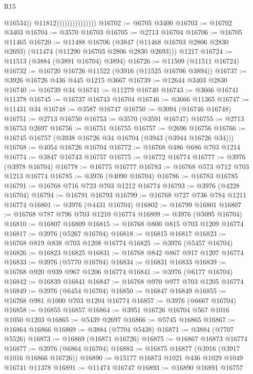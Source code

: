 \begin{lexlean}{R15}
\begin{coremodule}
                                      @16534))
                                  @11812)))))))))))))))
@16702 := @6705 @3400
@16703 := @16702 @3403
@16704 := @3570 @16703
@16705 := @2713 @16704
@16706 := @16705 @11465
@16720 := @11488
    @16706
    (@3847 (@11468 @16703 @2806 @2830 @2693) (@11474 (@11290 @16703 @2806 @2830 @2693)))
    @1217
@16724 := @11513 (@3884 (@3891 @16704) @3894)
@16726 := @11509 (@11511 @16724)
@16732 := @16720 @16726 @11522 (@3916 (@11525 @16706 @3894))
@16737 := @3926 @16726 @436 @445 @1215 @3667
@16739 := @12644 @3403 @2830
@16740 := @16739 @34
@16741 := @11279 @16740
@16743 := @3666 @16741 @11378
@16745 := @16737 @16743 @16704
@16746 := @3666 @11365
@16747 := @11431 @34
@16748 := @3587 @16747
@16750 := @3094 (@16746 @16748)
@16751 := @2713 @16750
@16753 := @3570 (@3591 @16747)
@16755 := @2713 @16753 @2697
@16756 := @16751 @16755
@16757 := @2696 @16756
@16766 := @16745 @16757 (@3938 @16726 @34 @16704 (@3943 (@3944 @16726 @34)))
@16768 := @4054 @16726 @16704
@16772 := @16768 @486 @686 @703 @1214
@16774 := @3847 @16743 @16757
@16775 := @16772 @16774
@16777 := @3976 (@3978 @16704)
@16778 := @16775 @16777
@16783 := @16768 @573 @712 @703 @1213 @16774
@16785 := @3976 (@4090 @16704)
@16786 := @16783 @16785
@16791 := @16768 @716 @723 @703 @1212 @16774
@16793 := @3976 (@4228 @16704)
@16794 := @16791 @16793
@16799 := @16768 @727 @736 @784 @1211 @16774
@16801 := @3976 (@4431 @16704)
@16802 := @16799 @16801
@16807 := @16768 @787 @796 @703 @1210 @16774
@16809 := @3976 (@5095 @16704)
@16810 := @16807 @16809
@16815 := @16768 @800 @815 @703 @1209 @16774
@16817 := @3976 (@5267 @16704)
@16818 := @16815 @16817
@16823 := @16768 @819 @838 @703 @1208 @16774
@16825 := @3976 (@5457 @16704)
@16826 := @16823 @16825
@16831 := @16768 @842 @867 @917 @1207 @16774
@16833 := @3976 (@5770 @16704)
@16834 := @16831 @16833
@16839 := @16768 @920 @939 @967 @1206 @16774
@16841 := @3976 (@6177 @16704)
@16842 := @16839 @16841
@16847 := @16768 @970 @977 @703 @1205 @16774
@16849 := @3976 (@6454 @16704)
@16850 := @16847 @16849
@16855 := @16768 @981 @1000 @703 @1204 @16774
@16857 := @3976 (@6667 @16704)
@16858 := @16855 @16857
@16864 := @3951 @16726 @16704 @567 @1016 @1050 @1203
@16865 := @5439 @2697
@16866 := @5745 @16865
@16867 := @16864 @16866
@16869 := @3884 (@7704 @5438)
@16871 := @3884 (@7707 @5526)
@16873 := @16869 (@16871 @16726)
@16875 := @16867 @16873 @16774
@16877 := @3976 (@6864 @16704)
@16883 := @16875 @16877 (@3916 (@3917 @1016 @16866 @16726))
@16890 := @15177 @16873 @1021 @436 @1029 @1049 @16741 @11378
@16891 := @11474 @16747
@16893 := @16890 @16891 @16757

\end{coremodule}
\end{lexlean}
